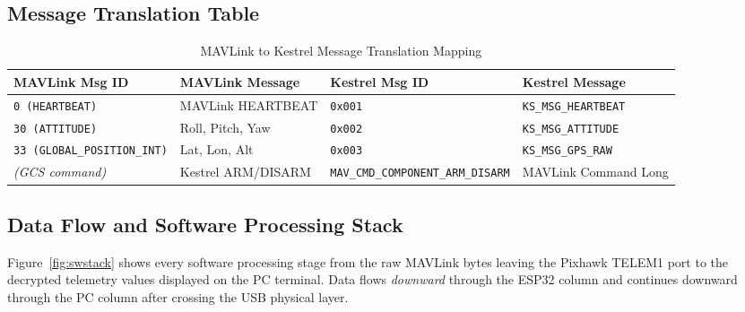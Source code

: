 \documentclass[11pt,a4paper]{article}
\begin{document}
\subsection{Message Translation Table}

\begin{table}[H]
    \centering
    \begin{tabularx}{\textwidth}{@{}lXlX@{}}
        \toprule
        \textbf{MAVLink Msg ID} & \textbf{MAVLink Message}    &
        \textbf{Kestrel Msg ID} & \textbf{Kestrel Message} \\
        \midrule
        \texttt{0 (HEARTBEAT)}            & MAVLink HEARTBEAT  &
        \texttt{0x001}                    & \texttt{KS\_MSG\_HEARTBEAT} \\
        \texttt{30 (ATTITUDE)}            & Roll, Pitch, Yaw   &
        \texttt{0x002}                    & \texttt{KS\_MSG\_ATTITUDE} \\
        \texttt{33 (GLOBAL\_POSITION\_INT)} & Lat, Lon, Alt    &
        \texttt{0x003}                    & \texttt{KS\_MSG\_GPS\_RAW} \\
        \textit{(GCS command)}            & Kestrel ARM/DISARM &
        \texttt{MAV\_CMD\_COMPONENT\_ARM\_DISARM} & MAVLink Command Long \\
        \bottomrule
    \end{tabularx}
    \caption{MAVLink to Kestrel Message Translation Mapping}
\end{table}

\subsection{Data Flow and Software Processing Stack}
\label{sec:swstack}

Figure~\ref{fig:swstack} shows every software processing stage from the
raw MAVLink bytes leaving the Pixhawk TELEM1 port to the decrypted
telemetry values displayed on the PC terminal.  Data flows \emph{downward}
through the ESP32 column and continues downward through the PC column
after crossing the USB physical layer.
\end{document}
